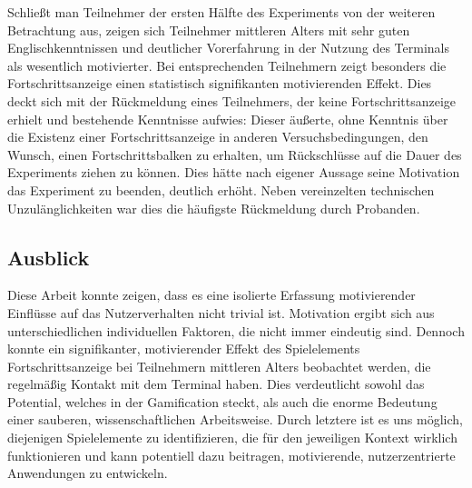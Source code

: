 Schließt man Teilnehmer der ersten Hälfte des Experiments von der weiteren Betrachtung aus, zeigen sich Teilnehmer mittleren Alters mit sehr guten Englischkenntnissen und deutlicher Vorerfahrung in der Nutzung des Terminals als wesentlich motivierter. Bei entsprechenden Teilnehmern zeigt besonders die Fortschrittsanzeige einen statistisch signifikanten motivierenden Effekt. Dies deckt sich mit der Rückmeldung eines Teilnehmers, der keine Fortschrittsanzeige erhielt und bestehende Kenntnisse aufwies: Dieser äußerte, ohne Kenntnis über die Existenz einer Fortschrittsanzeige in anderen Versuchsbedingungen, den Wunsch, einen Fortschrittsbalken zu erhalten, um Rückschlüsse auf die Dauer des Experiments ziehen zu können. Dies hätte nach eigener Aussage seine Motivation das Experiment zu beenden, deutlich erhöht. Neben vereinzelten technischen Unzulänglichkeiten war dies die häufigste Rückmeldung durch Probanden. 

\subsection{Ausblick}
Diese Arbeit konnte zeigen, dass es eine isolierte Erfassung motivierender Einflüsse auf das Nutzerverhalten nicht trivial ist. Motivation ergibt sich aus unterschiedlichen individuellen Faktoren, die nicht immer eindeutig sind. Dennoch konnte ein signifikanter, motivierender Effekt des Spielelements Fortschrittsanzeige bei Teilnehmern mittleren Alters beobachtet werden, die regelmäßig Kontakt mit dem Terminal haben. Dies verdeutlicht sowohl das Potential, welches in der Gamification steckt, als auch die enorme Bedeutung einer sauberen, wissenschaftlichen Arbeitsweise. Durch letztere ist es uns möglich, diejenigen Spielelemente zu identifizieren, die für den jeweiligen Kontext wirklich funktionieren und kann potentiell dazu beitragen, motivierende, nutzerzentrierte Anwendungen zu entwickeln.